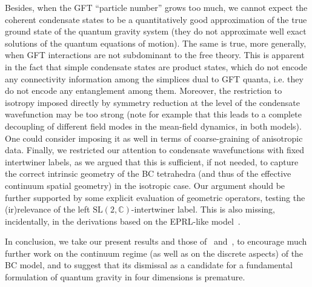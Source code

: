 \documentclass[11pt,a4paper]{article}
\newcommand{\C}{\mathbb C}
\newcommand{\SL}{\text{SL$(2,\C)$}}
\begin{document}
Besides, when the GFT \enquote{particle number} grows too much, we cannot expect the coherent condensate states to be a quantitatively good approximation of the true ground state of the quantum gravity system (they do not approximate well exact solutions of the quantum equations of motion). The same is true, more generally, when GFT interactions are not subdominant to the free theory. This is apparent in the fact that simple condensate states are product states, which do not encode any connectivity information among the simplices dual to GFT quanta, i.e. they do not encode any entanglement among them. Moreover, the restriction to isotropy imposed directly by symmetry reduction at the level of the condensate wavefunction may be too strong (note for example that this leads to a complete decoupling of different field modes in the mean-field dynamics, in both models). One could consider imposing it as well in terms of coarse-graining of anisotropic data. Finally, we restricted our attention to condensate wavefunctions with fixed intertwiner labels, as we argued that this is sufficient, if not needed, to capture the correct intrinsic geometry of the BC tetrahedra (and thus of the effective continuum spatial geometry) in the isotropic case. Our argument should be further supported by some explicit evaluation of geometric operators, testing the (ir)relevance of the left $\SL$-intertwiner label. This is also missing, incidentally, in the derivations based on the EPRL-like model~\cite{deCesare:2017ynn}.

In conclusion, we take our present results and those of~\cite{Dittrich:2021kzs} and~\cite{Baratin:2011tx}, to encourage much further work on the continuum regime (as well as on the discrete aspects) of the BC model, and to suggest that its dismissal as a candidate for a fundamental formulation of quantum gravity in four dimensions is premature.
\end{document}
